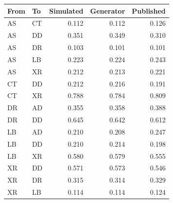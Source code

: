 \begin{tabular}{llrrr}
\toprule
From & To & Simulated & Generator & Published \\
\midrule
AS & CT & 0.112 & 0.112 & 0.126 \\
AS & DD & 0.351 & 0.349 & 0.310 \\
AS & DR & 0.103 & 0.101 & 0.101 \\
AS & LB & 0.223 & 0.224 & 0.243 \\
AS & XR & 0.212 & 0.213 & 0.221 \\
CT & DD & 0.212 & 0.216 & 0.191 \\
CT & XR & 0.788 & 0.784 & 0.809 \\
DR & AD & 0.355 & 0.358 & 0.388 \\
DR & DD & 0.645 & 0.642 & 0.612 \\
LB & AD & 0.210 & 0.208 & 0.247 \\
LB & DD & 0.210 & 0.214 & 0.198 \\
LB & XR & 0.580 & 0.579 & 0.555 \\
XR & DD & 0.571 & 0.573 & 0.546 \\
XR & DR & 0.315 & 0.314 & 0.329 \\
XR & LB & 0.114 & 0.114 & 0.124 \\
\bottomrule
\end{tabular}